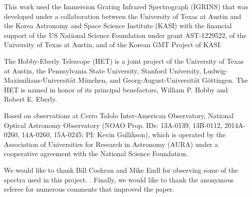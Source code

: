 \documentclass{emulateapj}
\begin{document}
This work used the Immersion Grating Infrared Spectrograph (IGRINS) that was developed under a collaboration between the University of Texas at Austin and the Korea Astronomy and Space Science Institute (KASI) with the financial support of the US National Science Foundation under grant AST-1229522, of the University of Texas at Austin, and of the Korean GMT Project of KASI.

The Hobby-Eberly Telescope (HET) is a joint project of the University of Texas at Austin, the Pennsylvania State University, Stanford University, Ludwig-Maximilians-Universit\"at M\"unchen, and Georg-August-Universit\"at G\"ottingen. The HET is named in honor of its principal benefactors, William P. Hobby and Robert E. Eberly.

Based on observations at Cerro Tololo Inter-American Observatory, National Optical Astronomy Observatory (NOAO Prop. IDs: 13A-0139, 13B-0112, 2014A-0260, 14A-0260, 15A-0245; PI: Kevin Gullikson), which is operated by the Association of Universities for Research in Astronomy (AURA) under a cooperative agreement with the National Science Foundation. 

We would like to thank Bill Cochran and Mike Endl for observing some of the spectra used in this project. . Finally, we would like to thank the anonymous referee for numerous comments that improved the paper.









\newpage
\clearpage
\end{document}
